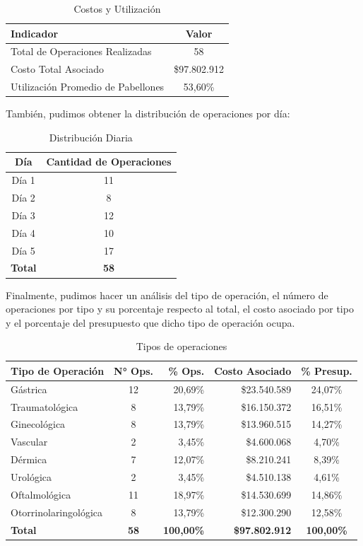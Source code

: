 \documentclass[a4paper,12pt]{book}
\begin{document}
	\begin{table}[htbp]
		\centering
		\caption{Costos y Utilización}
		\label{tab:resumen_general}
		\begin{tabular}{lc}
			\toprule
			\textbf{Indicador} & \textbf{Valor} \\
			\midrule
			Total de Operaciones Realizadas & 58 \\
			Costo Total Asociado & \$97.802.912 \\
			Utilización Promedio de Pabellones & 53,60\% \\
			\bottomrule
		\end{tabular}
	\end{table}
	\newpage
	También, pudimos obtener la distribución de operaciones por día:
	\begin{table}[htbp]
		\centering
		\caption{Distribución Diaria}
		\label{tab:operaciones_diarias}
		\begin{tabular}{cc}
			\toprule
			\textbf{Día} & \textbf{Cantidad de Operaciones} \\
			\midrule
			Día 1 & 11 \\
			Día 2 & 8 \\
			Día 3 & 12 \\
			Día 4 & 10 \\
			Día 5 & 17 \\
			\midrule
			\textbf{Total} & \textbf{58} \\
			\bottomrule
		\end{tabular}
	\end{table}
	Finalmente, pudimos hacer un análisis del tipo de operación, el número de operaciones por tipo y su porcentaje respecto al total, el costo asociado por tipo y el porcentaje del presupuesto que dicho tipo de operación ocupa.
	\begin{table}[htbp]
		\centering
		\caption{Tipos de operaciones}
		\label{tab:analisis_especialidad}
		\begin{tabular}{lcrrc}
			\toprule
			\textbf{Tipo de Operación} & \textbf{N° Ops.} & \textbf{\% Ops.} & \textbf{Costo Asociado} & \textbf{\% Presup.} \\
			\midrule
			Gástrica              & 12 & 20,69\% & \$23.540.589 & 24,07\% \\
			Traumatológica        & 8  & 13,79\% & \$16.150.372 & 16,51\% \\
			Ginecológica          & 8  & 13,79\% & \$13.960.515 & 14,27\% \\
			Vascular              & 2  & 3,45\%  & \$4.600.068  & 4,70\%  \\
			Dérmica               & 7  & 12,07\% & \$8.210.241  & 8,39\%  \\
			Urológica             & 2  & 3,45\%  & \$4.510.138  & 4,61\%  \\
			Oftalmológica         & 11 & 18,97\% & \$14.530.699 & 14,86\% \\
			Otorrinolaringológica & 8  & 13,79\% & \$12.300.290 & 12,58\% \\
			\midrule
			\textbf{Total}        & \textbf{58} & \textbf{100,00\%} & \textbf{\$97.802.912} & \textbf{100,00\%} \\
			\bottomrule
		\end{tabular}
	\end{table}
\end{document}
